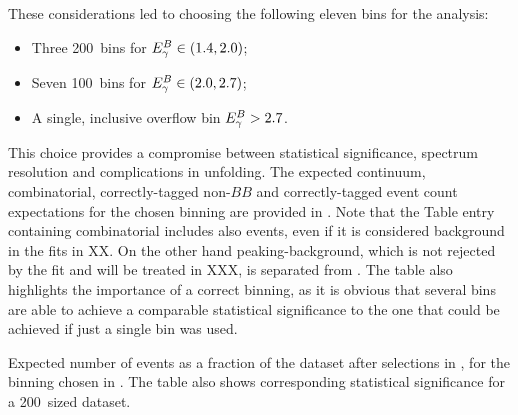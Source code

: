 These considerations led to choosing the following eleven \EB bins for the analysis:
\begin{itemize}
    \item Three 200~\mev bins for ${E^B_{\gamma}}\in(1.4,2.0)$;
    \item Seven 100~\mev bins for ${E^B_{\gamma}}\in(2.0,2.7)$;
    \item A single, inclusive overflow bin ${E^B_{\gamma}}>2.7$.
\end{itemize}
This choice provides a compromise between statistical significance, \EB spectrum resolution and complications in unfolding.
The expected continuum, combinatorial, correctly-tagged non-\BtoXsgamma $BB$ and correctly-tagged \BtoXsgamma event count expectations for the chosen binning are provided in .
Note that the Table entry containing combinatorial \BB includes also \BtoXsgamma events, even if it is considered background in the \Mbc fits in XX.
On the other hand peaking-\BB background, which is not rejected by the \Mbc fit and will be treated in XXX, is separated from \BtoXsgamma.
The table also highlights the importance of a correct binning, as it is obvious that several bins are able to achieve a comparable statistical significance to the one that could be achieved if just a single bin was used.

\begin{table}[htbp!]
    \caption{\label{tab:expected_events}Expected number of events as a fraction of the dataset after selections in , for the binning chosen in .
    The table also shows corresponding statistical significance for a 200~\invfb sized dataset.
    }
    
\end{table}

